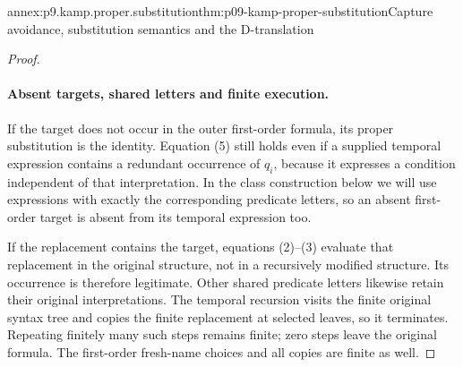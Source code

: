 \begin{annexitem}{annex:p9.kamp.proper.substitution}{thm:p09-kamp-proper-substitution}{Capture avoidance, substitution semantics and the D-translation}
\begin{proof}
\paragraph{Absent targets, shared letters and finite execution.}
If the target does not occur in the outer first-order formula, its proper
substitution is the identity. Equation (5) still holds even if a supplied
temporal expression contains a redundant occurrence of \(q_i\), because
it expresses a condition independent of that interpretation. In the
class construction below we will use expressions with exactly the
corresponding predicate letters, so an absent first-order target is absent
from its temporal expression too.

If the replacement contains the target, equations (2)--(3) evaluate that
replacement in the original structure, not in a recursively modified
structure. Its occurrence is therefore legitimate. Other shared predicate
letters likewise retain their original interpretations. The temporal
recursion visits the finite original syntax tree and copies the finite
replacement at selected leaves, so it terminates. Repeating finitely many
such steps remains finite; zero steps leave the original formula. The
first-order fresh-name choices and all copies are finite as well.
\end{proof}
\end{annexitem}

